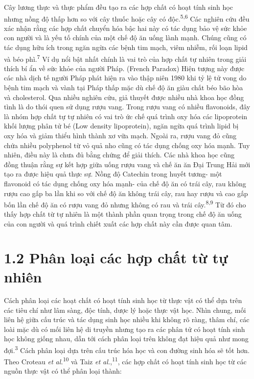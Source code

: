 \documentclass[
  letterpaper,
  DIV=11,
  numbers=noendperiod]{scrartcl}
\begin{document}
Cây lương thực và thực phẩm đều tạo ra các hợp chất có hoạt tính sinh
học nhưng nồng độ thấp hơn so với cây thuốc hoặc cây có
độc.\textsuperscript{5,6} Các nghiên cứu đều xác nhận rằng các hợp chất
chuyển hóa bậc hai này có tác dụng bảo vệ sức khỏe con người và là yếu
tố chính của một chế độ ăn uống lành mạnh. Chúng cũng có tác dụng hữu
ích trong ngăn ngừa các bệnh tim mạch, viêm nhiễm, rối loạn lipid và béo
phì.\textsuperscript{7} Ví dụ nổi bật nhất chính là vai trò của hợp chất
tự nhiên trong giải thích bí ẩn về sức khỏe của người Pháp. (French
Paradox) Hiện tượng này được các nhà dịch tế người Pháp phát hiện ra vào
thập niên 1980 khi tỷ lệ tử vong do bệnh tim mạch và vành tại Pháp thấp
mặc dù chế độ ăn giàu chất béo bão hòa và cholesterol. Qua nhiều nghiên
cứu, giả thuyết được nhiều nhà khoa học đồng tình là do thói quen sử
dụng rượu vang. Trong rượu vang có nhiều flavonoids, đây là nhóm hợp
chất tự tự nhiên có vai trò ức chế quá trình oxy hóa các lipoprotein
khối lượng phân tử bé (Low density lipoprotein), ngăn ngừa quá trình
lipid bị oxy hóa và giảm thiểu hình thành xơ vữa mạch. Ngoài ra, rượu
vang đỏ cũng chứa nhiều polyphenol từ vỏ quả nho cũng có tác dụng chống
oxy hóa mạnh. Tuy nhiên, điều này là chưa đủ bằng chứng để giải thích.
Các nhà khoa học cũng đồng thuận rằng sự kết hợp giữa uống rượu vang và
chế ăn ăn Đại Trung Hải mới tạo ra được hiệu quả thực sự. Nồng độ
Catechin trong huyết tương- một flavonoid có tác dụng chống oxy hóa
mạnh- của chế độ ăn có trái cây, rau không rượu cao gấp ba lần khi so
với chế độ ăn không trái cây, rau hay rượu và cao gấp bốn lần chế độ ăn
có rượu vang đỏ nhưng không có rau và trái cây.\textsuperscript{8,9} Từ
đó cho thấy hợp chất từ tự nhiên là một thành phần quan trọng trong chế
độ ăn uống của con người và quá trình chiết xuất các hợp chất này cần
được quan tâm.

\section{1.2 Phân loại các hợp chất từ tự
nhiên}\label{phuxe2n-loux1ea1i-cuxe1c-hux1ee3p-chux1ea5t-tux1eeb-tux1ef1-nhiuxean}

Cách phân loại các hoạt chất có hoạt tính sinh học từ thực vật có thể
dựa trên các tiêu chí như lâm sàng, độc tính, dược lý hoặc thực vật học.
Nhìn chung, mối liên hệ giữa cấu trúc và tác dụng sinh học nhiều khi
không rõ ràng, thâm chí, các loài mặc dù có mối liên hệ di truyền nhưng
tạo ra các phân tử có hoạt tính sinh học không giống nhau, dẫn tới cách
phân loại trên không đạt hiệu quả như mong đợi.\textsuperscript{3} Cách
phân loại dựa trên cấu trúc hóa học và con đường sinh hóa sẽ tốt hơn.
Theo Croteau \emph{et al.}\textsuperscript{10} và Taiz \emph{et
al.},\textsuperscript{11}, các hợp chất có hoạt tính sinh học từ các
nguồn thực vật có thể phân loại thành:
\end{document}
